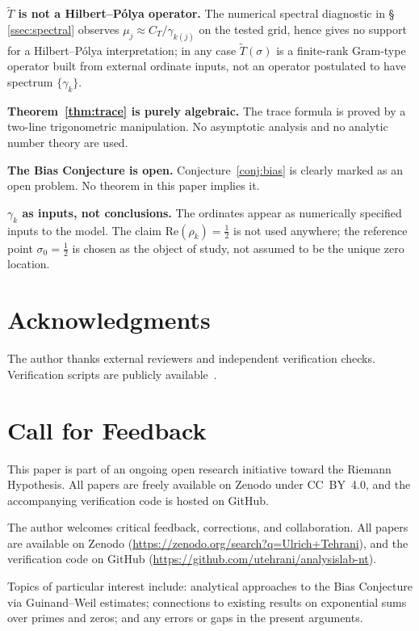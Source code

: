 \documentclass[11pt]{article}
\newcommand{\Tt}{\widetilde{T}}
\newcommand{\CT}{C_{T}}
\begin{document}
\textbf{$\Tt$ is not a Hilbert--P\'olya operator.}
The numerical spectral diagnostic in \S\,\ref{ssec:spectral}
observes $\mu_j\approx\CT/\gamma_{k(j)}$ on the tested grid, hence
gives no support for a Hilbert--P\'olya interpretation; in any case
$\Tt(\sigma)$ is a finite-rank Gram-type operator built from external
ordinate inputs, not an operator postulated to have spectrum
$\{\gamma_k\}$.

\textbf{Theorem~\ref{thm:trace} is purely algebraic.}
The trace formula is proved by a two-line trigonometric manipulation.
No asymptotic analysis and no analytic number theory are used.

\textbf{The Bias Conjecture is open.}
Conjecture~\ref{conj:bias} is clearly marked as an open problem.
No theorem in this paper implies it.

\textbf{$\gamma_k$ as inputs, not conclusions.}
The ordinates appear as numerically specified inputs to the model.
The claim $\mathrm{Re}(\rho_k)=\tfrac{1}{2}$ is not used anywhere;
the reference point $\sigma_0=\tfrac{1}{2}$ is chosen as the object
of study, not assumed to be the unique zero location.

\section*{Acknowledgments}

The author thanks external reviewers and
independent verification checks.
Verification scripts are publicly available~\cite{Code}.

\section*{Call for Feedback}

This paper is part of an ongoing open research initiative toward the
Riemann Hypothesis.
All papers are freely available on Zenodo under CC~BY~4.0,
and the accompanying verification code is hosted on GitHub.

The author welcomes critical feedback, corrections, and collaboration.
All papers are available on Zenodo
(\url{https://zenodo.org/search?q=Ulrich+Tehrani}),
and the verification code on GitHub
(\url{https://github.com/utehrani/analysislab-nt}).

Topics of particular interest include: analytical approaches to the
Bias Conjecture via Guinand--Weil estimates; connections to existing
results on exponential sums over primes and zeros; and any errors or
gaps in the present arguments.
\end{document}
